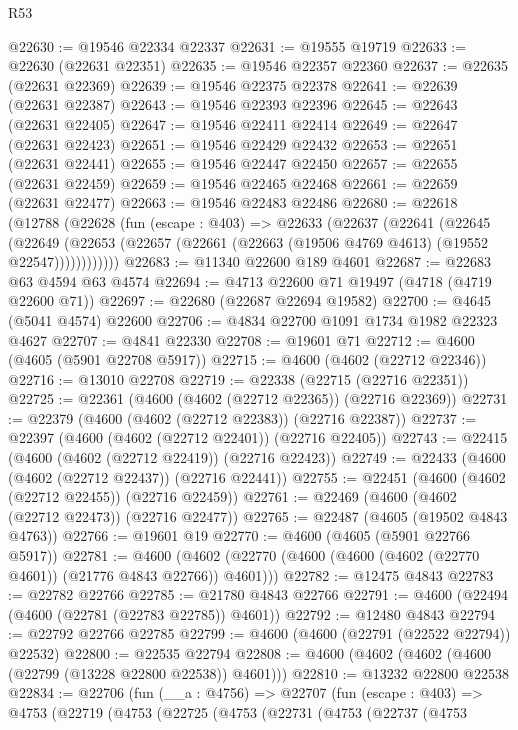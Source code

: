 \begin{lexlean}{R53}
\begin{coremodule}
@22630 := @19546 @22334 @22337
@22631 := @19555 @19719
@22633 := @22630 (@22631 @22351)
@22635 := @19546 @22357 @22360
@22637 := @22635 (@22631 @22369)
@22639 := @19546 @22375 @22378
@22641 := @22639 (@22631 @22387)
@22643 := @19546 @22393 @22396
@22645 := @22643 (@22631 @22405)
@22647 := @19546 @22411 @22414
@22649 := @22647 (@22631 @22423)
@22651 := @19546 @22429 @22432
@22653 := @22651 (@22631 @22441)
@22655 := @19546 @22447 @22450
@22657 := @22655 (@22631 @22459)
@22659 := @19546 @22465 @22468
@22661 := @22659 (@22631 @22477)
@22663 := @19546 @22483 @22486
@22680 := @22618
    (@12788
      (@22628
        (fun (escape : @403) =>
        @22633
          (@22637
            (@22641
              (@22645
                (@22649
                  (@22653 (@22657 (@22661 (@22663 (@19506 @4769 @4613) (@19552 @22547))))))))))))
@22683 := @11340 @22600 @189 @4601
@22687 := @22683 @63 @4594 @63 @4574
@22694 := @4713 @22600 @71 @19497 (@4718 (@4719 @22600 @71))
@22697 := @22680 (@22687 @22694 @19582)
@22700 := @4645 (@5041 @4574) @22600
@22706 := @4834 @22700 @1091 @1734 @1982 @22323 @4627
@22707 := @4841 @22330
@22708 := @19601 @71
@22712 := @4600 (@4605 (@5901 @22708 @5917))
@22715 := @4600 (@4602 (@22712 @22346))
@22716 := @13010 @22708
@22719 := @22338 (@22715 (@22716 @22351))
@22725 := @22361 (@4600 (@4602 (@22712 @22365)) (@22716 @22369))
@22731 := @22379 (@4600 (@4602 (@22712 @22383)) (@22716 @22387))
@22737 := @22397 (@4600 (@4602 (@22712 @22401)) (@22716 @22405))
@22743 := @22415 (@4600 (@4602 (@22712 @22419)) (@22716 @22423))
@22749 := @22433 (@4600 (@4602 (@22712 @22437)) (@22716 @22441))
@22755 := @22451 (@4600 (@4602 (@22712 @22455)) (@22716 @22459))
@22761 := @22469 (@4600 (@4602 (@22712 @22473)) (@22716 @22477))
@22765 := @22487 (@4605 (@19502 @4843 @4763))
@22766 := @19601 @19
@22770 := @4600 (@4605 (@5901 @22766 @5917))
@22781 := @4600 (@4602 (@22770 (@4600 (@4600 (@4602 (@22770 @4601)) (@21776 @4843 @22766)) @4601)))
@22782 := @12475 @4843
@22783 := @22782 @22766
@22785 := @21780 @4843 @22766
@22791 := @4600 (@22494 (@4600 (@22781 (@22783 @22785)) @4601))
@22792 := @12480 @4843
@22794 := @22792 @22766 @22785
@22799 := @4600 (@4600 (@22791 (@22522 @22794)) @22532)
@22800 := @22535 @22794
@22808 := @4600 (@4602 (@4602 (@4600 (@22799 (@13228 @22800 @22538)) @4601)))
@22810 := @13232 @22800 @22538
@22834 := @22706
    (fun (__a : @4756) =>
    @22707
      (fun (escape : @403) =>
      @4753
        (@22719
          (@4753
            (@22725
              (@4753
                (@22731
                  (@4753
                    (@22737
                      (@4753

\end{coremodule}
\end{lexlean}
